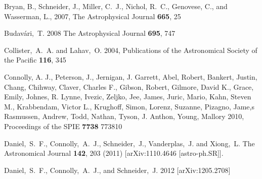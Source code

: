 \documentclass[prd,nofootbib,floatfix,11pt,tightenlines]{revtex4}
\begin{document}
\begin{thebibliography}{99}

Bryan, B., Schneider, J., Miller, C.~J., Nichol, R.~C., Genovese, C., and
Wasserman, L., 2007,
The Astrophysical Journal {\bf 665}, 25

Budav\'ari,~T. 2008 The Astrophysical Journal {\bf 695}, 747

Collister,~A.~A. and Lahav,~O. 2004,
Publications of the Astronomical Society of the Pacific {\bf 116}, 345


Connolly, A. J., Peterson, J., Jernigan, J. Garrett, Abel, Robert, Bankert, Justin,
Chang, Chihway, Claver, Charles F., Gibson, Robert, Gilmore, David K., Grace, Emily,
Johnes, R. Lynne, Ivezic, Zeljko, Jee, James, Juric, Mario, Kahn, Steven M.,
Krabbendam, Victor L., Krughoff, Simon, Lorenz, Suzanne, Pizagno, Jame,s Rasmussen,
Andrew, Todd, Nathan, Tyson, J. Anthon, Young, Mallory 2010, Proceedings of the SPIE
{\bf 7738} 773810



  Daniel,~S.~F., Connolly,~A.~J., Schneider,~J., Vanderplas,~J. and Xiong,~L. 
  The Astronomical Journal  {\bf 142}, 203 (2011)
  [arXiv:1110.4646 [astro-ph.SR]].

Daniel,~S.~F., Connolly,~A.~J., and Schneider,~J. 2012
[arXiv:1205.2708]


\end{thebibliography}
\end{document}

